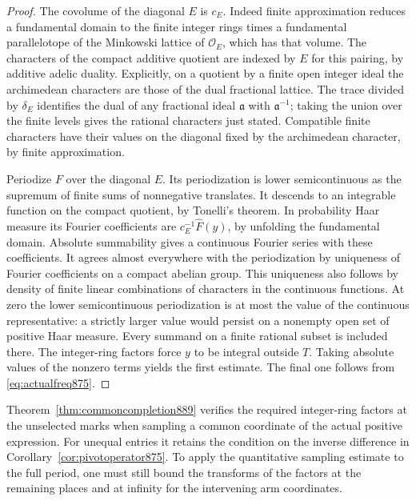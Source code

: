 \documentclass[a4paper,11pt]{article}
\theoremstyle{definition}
\theoremstyle{remark}
\numberwithin{equation}{section}
\begin{document}
\begin{proof}
The covolume of the diagonal \(E\) is \(c_E\). Indeed finite
approximation reduces a fundamental domain to the finite integer
rings times a fundamental parallelotope of the Minkowski lattice
of \(\mathcal O_E\), which has that volume. The characters of
the compact additive quotient are indexed by \(E\) for this
pairing, by additive adelic duality. Explicitly, on a quotient
by a finite open integer ideal the archimedean characters are
those of the dual fractional lattice. The trace divided by
\(\delta_E\) identifies the dual of any fractional ideal
\(\mathfrak a\) with \(\mathfrak a^{-1}\); taking the union over
the finite levels gives the rational characters just stated.
Compatible finite characters have their values on the diagonal
fixed by the archimedean character, by finite approximation.

Periodize \(F\) over the diagonal \(E\). Its periodization is
lower semicontinuous as the supremum of finite sums of
nonnegative translates. It descends to an integrable function
on the compact quotient, by Tonelli's theorem. In probability
Haar measure its Fourier coefficients are
\(c_E^{-1}\widehat F(y)\), by unfolding the fundamental domain.
Absolute summability gives a continuous Fourier series with
these coefficients. It agrees almost everywhere with the
periodization by uniqueness of Fourier coefficients on a compact
abelian group. This uniqueness also follows by density of finite
linear combinations of characters in the continuous functions.
At zero the lower semicontinuous periodization is at most the
value of the continuous representative: a strictly larger value
would persist on a nonempty open set of positive Haar measure.
Every summand on a finite rational subset is included there.
The integer-ring factors force \(y\) to be integral outside
\(T\). Taking absolute values of the nonzero terms yields the
first estimate. The final one follows from
\eqref{eq:actualfreq875}.
\end{proof}

Theorem~\ref{thm:commoncompletion889} verifies the required
integer-ring factors at the unselected marks when sampling a
common coordinate of the actual positive expression. For
unequal entries it retains the condition on the inverse
difference in Corollary~\ref{cor:pivotoperator875}. To apply the
quantitative sampling estimate to the full period, one must
still bound the transforms of the factors at the remaining
places and at infinity for the intervening arm coordinates.
\clearpage
\end{document}
